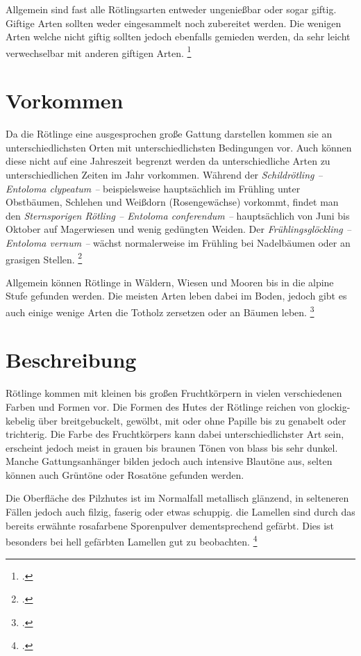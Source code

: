 \documentclass[a4paper,abstracton]{scrreprt}
\begin{document}
Allgemein sind fast alle Rötlingsarten entweder ungenießbar oder sogar giftig. Giftige Arten sollten weder eingesammelt noch zubereitet werden. Die wenigen Arten welche nicht giftig sollten jedoch ebenfalls gemieden werden, da sehr leicht verwechselbar mit anderen giftigen Arten. \footcite{kosmos}

\section{Vorkommen}
Da die Rötlinge eine ausgesprochen große Gattung darstellen kommen sie an unterschiedlichsten Orten mit unterschiedlichsten Bedingungen vor. Auch können diese nicht auf eine Jahreszeit begrenzt werden da unterschiedliche Arten zu unterschiedlichen Zeiten im Jahr vorkommen. Während der \emph{Schildrötling -- Entoloma clypeatum --} beispielsweise hauptsächlich im Frühling unter Obstbäumen, Schlehen und Weißdorn (Rosengewächse) vorkommt, findet man den \emph{Sternsporigen Rötling -- Entoloma conferendum --} hauptsächlich von Juni bis Oktober auf Magerwiesen und wenig gedüngten Weiden. Der \emph{Frühlingsglöckling -- Entoloma vernum --} wächst normalerweise im Frühling bei Nadelbäumen oder an grasigen Stellen. \footcite{naturfuehrer} 

Allgemein können Rötlinge in Wäldern, Wiesen und Mooren bis in die alpine Stufe gefunden werden. Die meisten Arten leben dabei im Boden, jedoch gibt es auch einige wenige Arten die Totholz zersetzen oder an Bäumen leben. \footcite{faktenuber}

\section{Beschreibung}
Rötlinge kommen mit kleinen bis großen Fruchtkörpern in vielen verschiedenen Farben und Formen vor. Die Formen des Hutes der Rötlinge reichen von glockig-kebelig über breitgebuckelt, gewölbt, mit oder ohne Papille bis zu genabelt oder trichterig. Die Farbe des Fruchtkörpers kann dabei unterschiedlichster Art sein, erscheint jedoch meist in grauen bis braunen Tönen von blass bis sehr dunkel. Manche Gattungsanhänger bilden jedoch auch intensive Blautöne aus, selten können auch Grüntöne oder Rosatöne gefunden werden. 

Die Oberfläche des Pilzhutes ist im Normalfall metallisch glänzend, in selteneren Fällen jedoch auch filzig, faserig oder etwas schuppig. die Lamellen sind durch das bereits erwähnte rosafarbene Sporenpulver dementsprechend gefärbt. Dies ist besonders bei hell gefärbten Lamellen gut zu beobachten.
\footcite{beschreibung}
\end{document}
